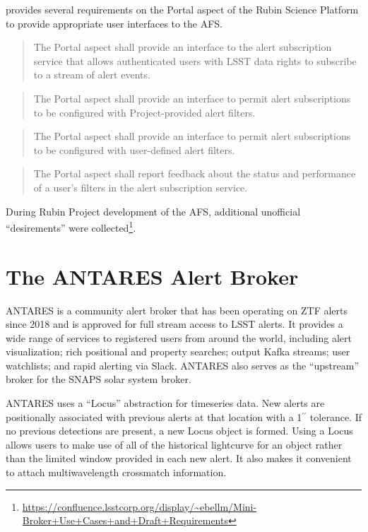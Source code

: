 \documentclass[DM,authoryear,toc]{lsstdoc}
\begin{document}
 provides several requirements on the Portal aspect of the Rubin Science Platform to provide appropriate user interfaces to the AFS.

\begin{quote}
  The Portal aspect shall provide an interface to the alert subscription service that allows authenticated users with LSST data rights to subscribe to a stream of alert events.
\end{quote}

\begin{quote}
  The Portal aspect shall provide an interface to permit alert subscriptions to be
configured with Project-provided alert filters.
\end{quote}

\begin{quote}
  The Portal aspect shall provide an interface to permit alert subscriptions to be
  configured with user-defined alert filters. 
\end{quote}

\begin{quote}
  The Portal aspect shall report feedback about the status and performance of
a user’s filters in the alert subscription service.
\end{quote}



During Rubin Project development of the AFS, additional unofficial ``desirements'' were collected\footnote{\url{https://confluence.lsstcorp.org/display/~ebellm/Mini-Broker+Use+Cases+and+Draft+Requirements}}.

\section{The ANTARES Alert Broker} \label{sec:antares}

ANTARES is a community alert broker that has been operating on ZTF alerts since 2018 and is approved for full stream access to LSST alerts.
It provides a wide range of services to registered users from around the world, including alert visualization; rich positional and property searches; output Kafka streams; user watchlists; and rapid alerting via Slack.
ANTARES also serves as the ``upstream'' broker for the SNAPS solar system broker.

ANTARES uses a ``Locus'' abstraction for timeseries data.
New alerts are positionally associated with previous alerts at that location with a 1$^{\prime\prime}$ tolerance.
If no previous detections are present, a new Locus object is formed.
Using a Locus allows users to make use of all of the historical lightcurve for an object rather than the limited window provided in each new alert.
It also makes it convenient to attach multiwavelength crossmatch information.
\end{document}
